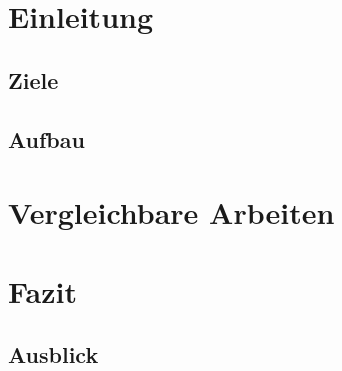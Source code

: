 \section{Einleitung}
\paragraph{}

\subsection{Ziele}

\subsection{Aufbau}

\section{Vergleichbare Arbeiten}
\label{sec:vergleichbare_arbeiten}

\section{Fazit}
\label{sec:fazit}

\subsection{Ausblick}

